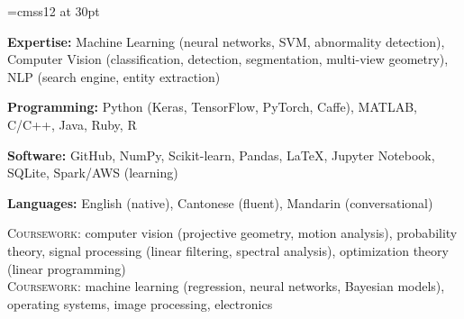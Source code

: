 \documentclass[letterpaper, 12pt]{cv_style}
\begin{document}
\font\titlefont=cmss12 at 30pt



\begin{ditem}
	\item \textbf{Expertise:} Machine Learning (neural networks, SVM, abnormality detection), Computer Vision (classification, detection, segmentation, multi-view geometry), NLP (search engine, entity extraction)
	\item \textbf{Programming:} Python (Keras, TensorFlow, PyTorch, Caffe), MATLAB, C/C++, Java, Ruby, R
	\item \textbf{Software:} GitHub, NumPy, Scikit-learn, Pandas, \LaTeX, Jupyter Notebook, SQLite, Spark/AWS (learning)	%
	\item \textbf{Languages:} English (native), Cantonese (fluent), Mandarin (conversational)
\end{ditem}

\flushleft{}
\medspace
\textsc{Coursework:} computer vision (projective geometry, motion analysis), probability theory, signal processing (linear filtering, spectral analysis), optimization theory (linear programming)\\
\medspace
{}
\medspace
\textsc{Coursework:} machine learning (regression, neural networks, Bayesian models), operating systems, image processing, electronics
\medspace
\end{document}
